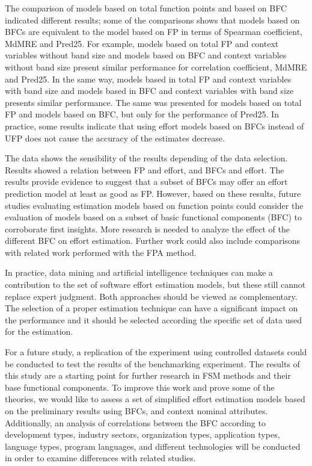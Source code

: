 \documentclass[conference]{IEEEtran}
\begin{document}
The comparison of models based on total function points and based on BFC indicated different results; some of the comparisons shows that models based on BFCs are equivalent to the model based on FP in terms of Spearman coefficient, MdMRE and Pred25. For example, models based on total FP and context variables without band size and models based on BFC and context variables without band size present similar performance for correlation coefficient, MdMRE and Pred25. In the same way, models based in total FP and context variables with band size and models based in BFC and context variables with band size presents similar performance. The same was presented for models based on total FP and models based on BFC, but only for the performance of Pred25. In practice, some results indicate that using effort models based on BFCs instead of UFP does not cause the accuracy of the estimates decrease. 

The data shows the sensibility of the results depending of the data selection. Results showed a relation between FP and effort, and BFCs and effort. The results provide evidence to suggest that a subset of BFCs may offer an effort prediction model at least as good as FP. However, based on these results, future studies evaluating estimation models based on function points could consider the evaluation of models based on a subset of basic functional components (BFC) to corroborate first insights. More research is needed to analyze the effect of the different BFC on effort estimation. Further work could also include comparisons with related work performed with the FPA method.

In practice, data mining and artificial intelligence techniques can make a contribution to the set of software effort estimation models, but these still cannot replace expert judgment. Both approaches should be viewed as complementary. The selection of a proper estimation technique can have a significant impact on the performance and it should be selected according the specific set of data used for the estimation.

For a future study, a replication of the experiment using controlled datasets could be conducted to test the results of the benchmarking experiment. The results of this study are a starting point for further research in FSM methods and their base functional components. To improve this work and prove some of the theories, we would like to assess a set of simplified effort estimation models based on the preliminary results using BFCs, and context nominal attributes. Additionally, an analysis of correlations between the BFC according to development types, industry sectors, organization types, application types, language types, program languages, and different technologies will be conducted in order to examine differences with related studies. 
\end{document}
